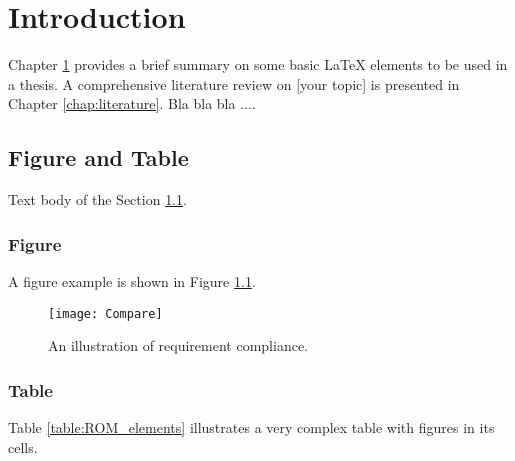 \chapter{Introduction}
\label{chap:introdcution}

Chapter \ref{chap:introdcution} provides a brief summary on some basic \LaTeX{} elements to be used in a thesis. A comprehensive literature review on [your topic] is presented in Chapter \ref{chap:literature}. Bla bla bla ....

\section{Figure and Table}
\label{sec:FigureAndTable}

Text body of the Section \ref{sec:FigureAndTable}.

\subsection{Figure}
\label{subSec:Figure}


A figure example is shown in Figure \ref{fig:Compare}.

\begin{figure}
\begin{center}
\texttt{[image: Compare]}  %
\end{center}
\caption{An illustration of requirement compliance.}
\label{fig:Compare}
\end{figure}


\subsection{Table}
\label{subSec:Table}

 Table \ref{table:ROM_elements} illustrates a very complex table with figures in its cells.

